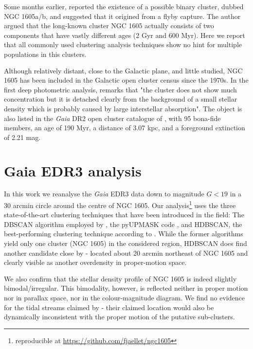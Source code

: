 \documentclass[RNAAS]{aastex631}
\begin{document}
Some months earlier, \citet{Camargo2021} reported the existence of a possible binary cluster, dubbed NGC 1605a/b, and suggested that it origined from a flyby capture. The author argued that the long-known cluster NGC 1605 actually consists of two components that have vastly different ages (2 Gyr and 600 Myr). Here we report that all commonly used clustering analysis techniques show no hint for multiple populations in this clusters.

Although relatively distant, close to the Galactic plane, and little studied, NGC 1605 has been included in the Galactic open cluster census since the 1970s. In the first deep photometric analysis, \citet{Fang1970} remarks that "the cluster does not show much concentration but it is detached clearly from the background of a small stellar density which is probably caused by large interstellar absorption". %
The object is also listed in the {\it Gaia} DR2 open cluster catalogue of \citet{Cantat2020}, with 95 bona-fide members, an age of 190 Myr, a distance of 3.07 kpc, and a foreground extinction of 2.21 mag.

\section{Gaia EDR3 analysis}
In this work we reanalyse the {\it Gaia} EDR3 data \citep{Gaia2021} down to magnitude $G<19$ in a 30 arcmin circle around the centre of NGC 1605. Our analysis\footnote{reproducible at \url{https://github.com/fjaellet/ngc1605}} uses the three state-of-the-art clustering techniques that have been introduced in the field: The DBSCAN algorithm employed by \citet{Castro2022}, the pyUPMASK code \citep{Pera2021}, and HDBSCAN, the best-performing clustering technique according to \citet{Hunt2021}. 
While the former algorithms yield only one cluster (NGC 1605) in the considered region, HDBSCAN does find another candidate close by - located about 20 arcmin northeast of NGC 1605 and clearly visible as another overdensity in proper-motion space.

We also confirm that the stellar density profile of NGC 1605 is indeed slightly bimodal/irregular. This bimodality, however, is reflected neither in proper motion nor in parallax space, nor in the colour-magnitude diagram. We find no evidence for the tidal streams claimed by \citet{Camargo2021} - their claimed location would also be dynamically inconsistent with the proper motion of the putative sub-clusters.
\end{document}
